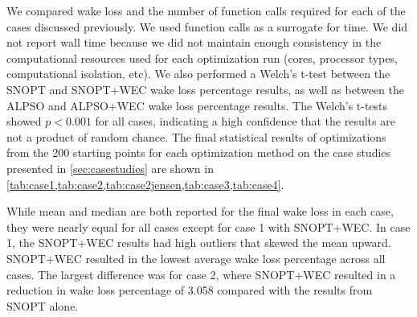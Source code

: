 \documentclass[journal abbreviation, manuscript]{copernicus}
\begin{document}
	We compared wake loss and the number of function calls required for each of the cases discussed previously. We used function calls as a surrogate for time. We did not report wall time because we did not maintain enough consistency in the computational resources used for each optimization run (cores, processor types, computational isolation, etc). We also performed a Welch's t-test between the SNOPT and SNOPT+WEC wake loss percentage results, as well as between the ALPSO and ALPSO+WEC wake loss percentage results. The Welch's t-tests showed $p<0.001$ for all cases, indicating a high confidence that the results are not a product of random chance. The final statistical results of optimizations from the 200 starting points for each optimization method on the case studies presented in \ref{sec:casestudies} are shown in \ref{tab:case1,tab:case2,tab:case2jensen,tab:case3,tab:case4}. 
	
	While mean and median are both reported for the final wake loss in each case, they were nearly equal for all cases except for case 1 with SNOPT+WEC. In case 1, the SNOPT+WEC results had high outliers that skewed the mean upward. SNOPT+WEC resulted in the lowest average wake loss percentage across all cases. The largest difference was for case 2, where SNOPT+WEC resulted in a reduction in wake loss percentage of 3.058 compared with the results from SNOPT alone.
	
\end{document}
